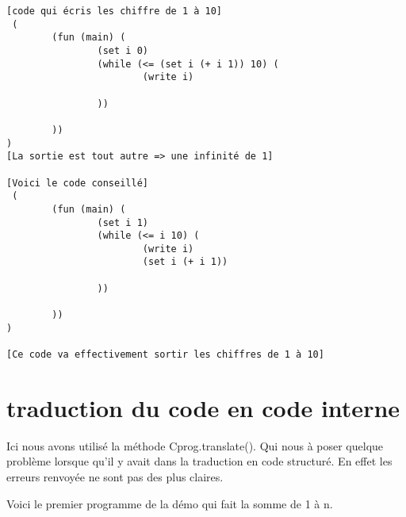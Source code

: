 \begin{verbatim}
[code qui écris les chiffre de 1 à 10]
 (
        (fun (main) (
                (set i 0)
                (while (<= (set i (+ i 1)) 10) (
                        (write i)

                ))

        ))
)
[La sortie est tout autre => une infinité de 1]

[Voici le code conseillé]
 (
        (fun (main) (
                (set i 1)
                (while (<= i 10) (
                        (write i)
                        (set i (+ i 1))

                ))

        ))
)

[Ce code va effectivement sortir les chiffres de 1 à 10]
\end{verbatim}

\section{traduction du code en code interne}
Ici nous avons utilisé la méthode Cprog.translate(). Qui nous à poser quelque problème lorsque qu'il y avait dans la traduction en code 
structuré. En effet les erreurs renvoyée ne sont pas des plus claires.

Voici le premier programme de la démo qui fait la somme de 1 à n.

